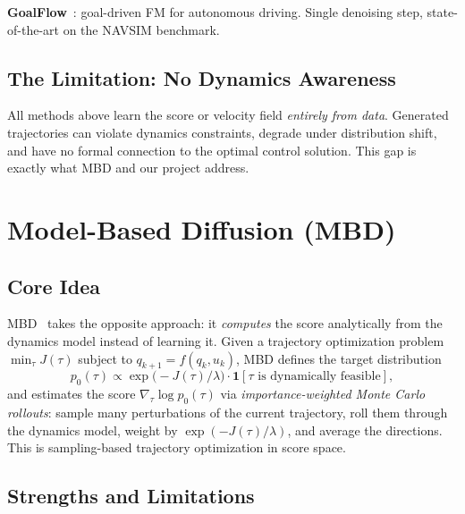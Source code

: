 \documentclass[letterpaper, 10pt, conference]{ieeeconf}
\begin{document}
\textbf{GoalFlow}~\cite{xing2025goalflow}: goal-driven FM for autonomous
driving. Single denoising step, state-of-the-art on the NAVSIM benchmark.

\subsection{The Limitation: No Dynamics Awareness}

All methods above learn the score or velocity field \emph{entirely from data}.
Generated trajectories can violate dynamics constraints, degrade under
distribution shift, and have no formal connection to the optimal control
solution. This gap is exactly what MBD and our project address.

\section{Model-Based Diffusion (MBD)}
\label{sec:mbd}

\subsection{Core Idea}

MBD~\cite{mbd} takes the opposite approach: it \emph{computes} the score
analytically from the dynamics model instead of learning it.  Given a trajectory
optimization problem $\min_\tau J(\tau)$ subject to $q_{k+1} = f(q_k,u_k)$, MBD
defines the target distribution
\begin{equation}
  p_0(\tau) \propto \exp\!\bigl(-J(\tau)/\lambda\bigr)\cdot\mathbf{1}[\tau\text{ is dynamically feasible}],
  \label{eq:mbd_target}
\end{equation}
and estimates the score $\nabla_\tau\log p_0(\tau)$ via \emph{importance-weighted
Monte Carlo rollouts}: sample many perturbations of the current trajectory,
roll them through the dynamics model, weight by $\exp(-J(\tau)/\lambda)$, and
average the directions. This is sampling-based trajectory optimization in score space.

\subsection{Strengths and Limitations}
\end{document}
